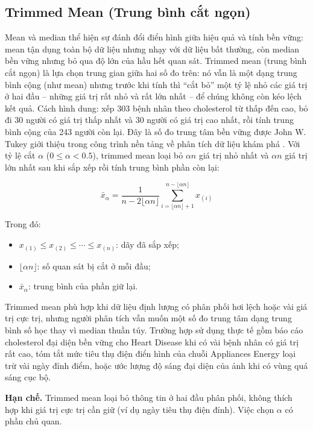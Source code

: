 \subsection{Trimmed Mean (Trung bình cắt ngọn)}

Mean và median thể hiện sự đánh đổi điển hình giữa hiệu quả và tính bền vững: mean tận dụng toàn bộ dữ liệu nhưng nhạy với dữ liệu bất thường, còn median bền vững nhưng bỏ qua độ lớn của hầu hết quan sát. Trimmed mean (trung bình cắt ngọn) là lựa chọn trung gian giữa hai số đo trên: nó vẫn là một dạng trung bình cộng (như mean) nhưng trước khi tính thì ``cắt bỏ'' một tỷ lệ nhỏ các giá trị ở hai đầu -- những giá trị rất nhỏ và rất lớn nhất -- để chúng không còn kéo lệch kết quả. Cách hình dung: xếp 303 bệnh nhân theo cholesterol từ thấp đến cao, bỏ đi 30 người có giá trị thấp nhất và 30 người có giá trị cao nhất, rồi tính trung bình cộng của 243 người còn lại. Đây là số đo trung tâm bền vững được John W. Tukey giới thiệu trong công trình nền tảng về phân tích dữ liệu khám phá \cite{Tukey1977EDA}. Với tỷ lệ cắt $\alpha$ ($0 \le \alpha < 0.5$), trimmed mean loại bỏ $\alpha n$ giá trị nhỏ nhất và $\alpha n$ giá trị lớn nhất sau khi sắp xếp rồi tính trung bình phần còn lại:

\begin{equation}
\bar{x}_{\alpha} = \frac{1}{n - 2\lfloor \alpha n \rfloor}\sum_{i=\lfloor \alpha n \rfloor+1}^{n-\lfloor \alpha n \rfloor} x_{(i)}
\end{equation}

Trong đó:
\begin{itemize}[leftmargin=1.6em,label=\textbullet]
 \item $x_{(1)} \le x_{(2)} \le \cdots \le x_{(n)}$: dãy đã sắp xếp;
 \item $\lfloor \alpha n \rfloor$: số quan sát bị cắt ở mỗi đầu;
 \item $\bar{x}_{\alpha}$: trung bình của phần giữ lại.
\end{itemize}

Trimmed mean phù hợp khi dữ liệu định lượng có phân phối hơi lệch hoặc vài giá trị cực trị, nhưng người phân tích vẫn muốn một số đo trung tâm dạng trung bình số học thay vì median thuần túy. Trường hợp sử dụng thực tế gồm báo cáo cholesterol đại diện bền vững cho Heart Disease khi có vài bệnh nhân có giá trị rất cao, tóm tắt mức tiêu thụ điện điển hình của chuỗi Appliances Energy loại trừ vài ngày đỉnh điểm, hoặc ước lượng độ sáng đại diện của ảnh khi có vùng quá sáng cục bộ.

\textbf{Hạn chế.} Trimmed mean loại bỏ thông tin ở hai đầu phân phối, không thích hợp khi giá trị cực trị cần giữ (ví dụ ngày tiêu thụ điện đỉnh). Việc chọn $\alpha$ có phần chủ quan.

